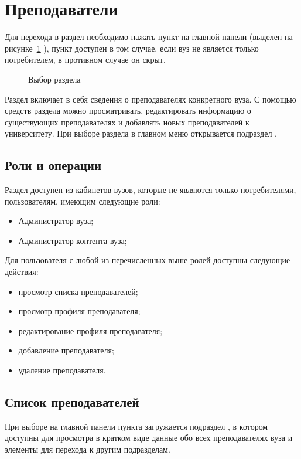 \graphicspath{{images/instructor/}}

\section{Преподаватели}
Для перехода в раздел необходимо нажать пункт  на главной панели (выделен на рисунке~\ref{instructor:instructor_section} ), пункт доступен в том случае, если вуз не является только потребителем, в противном случае он скрыт.

\begin{figure}[H]
	\caption{Выбор раздела }
	\label{instructor:instructor_section}
\end{figure}

Раздел включает в себя сведения о преподавателях конкретного вуза. С помощью средств раздела можно просматривать, редактировать информацию о существующих преподавателях и добавлять новых преподавателей к университету. При выборе раздела в главном меню открывается подраздел .

\subsection{Роли и операции}
Раздел доступен из кабинетов вузов, которые не являются только потребителями, пользователям, имеющим следующие роли:
\begin{itemize}
	\item Администратор вуза;
	\item Администратор контента вуза;
\end{itemize}

Для пользователя с любой из перечисленных выше ролей доступны следующие действия:
\begin{itemize}
	\item просмотр списка преподавателей;
	\item просмотр профиля преподавателя;
	\item редактирование профиля преподавателя;
	\item добавление преподавателя;
	\item удаление преподавателя.
\end{itemize}

\subsection{Список преподавателей}
При выборе на главной панели пункта  загружается подраздел , в котором доступны для просмотра в кратком виде данные обо всех преподавателях вуза и элементы для перехода к другим подразделам.

